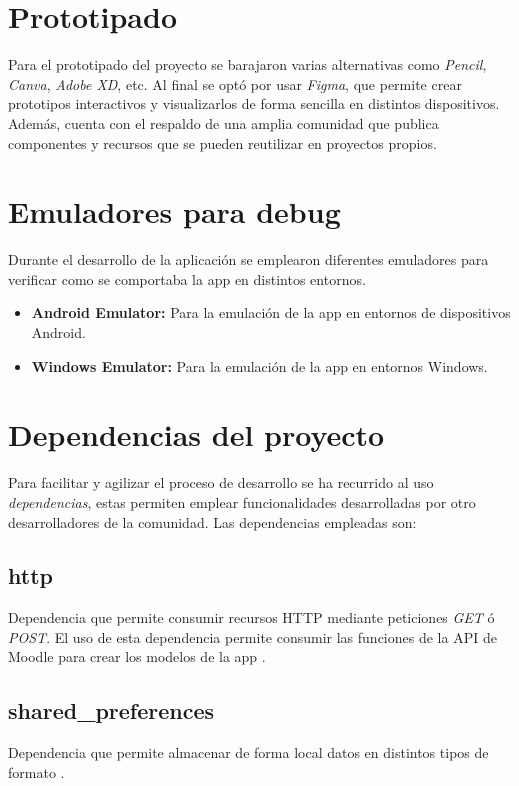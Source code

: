 \section{Prototipado}

Para el prototipado del proyecto se barajaron varias alternativas como \textit{Pencil}, \textit{Canva}, \textit{Adobe XD}, etc. Al final se optó por usar \textit{Figma}, que permite crear prototipos interactivos y visualizarlos de forma sencilla en distintos dispositivos. Además, cuenta con el respaldo de una amplia comunidad que publica componentes y recursos que se pueden reutilizar en proyectos propios.

\section{Emuladores para debug}

Durante el desarrollo de la aplicación se emplearon diferentes emuladores para verificar como se comportaba la app en distintos entornos.

\begin{itemize}
    \item \textbf{Android Emulator:} Para la emulación de la app en entornos de dispositivos Android.
    \item \textbf{Windows Emulator:} Para la emulación de la app en entornos Windows.
\end{itemize}

\section{Dependencias del proyecto}

Para facilitar y agilizar el proceso de desarrollo se ha recurrido al uso \textit{dependencias}, estas permiten emplear funcionalidades desarrolladas por otro desarrolladores de la comunidad. Las dependencias empleadas son:

\subsection{http}
Dependencia que permite consumir recursos HTTP mediante peticiones \textit{GET} ó \textit{POST}. El uso de esta dependencia permite consumir las funciones de la API de Moodle para crear los modelos de la app \cite{http}.
\subsection{shared\_preferences}
Dependencia que permite almacenar de forma local datos en distintos tipos de formato \cite{shared_preferences}.
